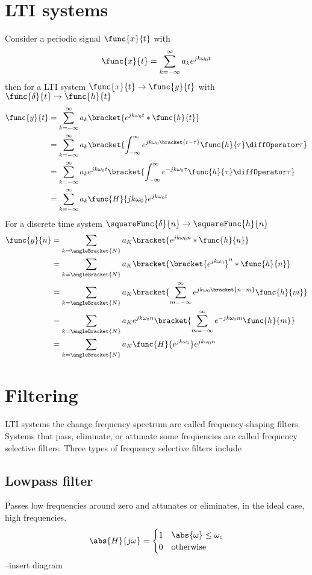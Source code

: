 \section{LTI systems}
Consider a periodic signal \(\func{x}{t}\) with 
\begin{equation*}
    \func{x}{t} = \sum_{k = -\infty}^{\infty} a_k e^{jk \omega_0 t}
\end{equation*}
then for a LTI system \(\func{x}{t} \to \func{y}{t}\) with \(\func{\delta}{t} \to \func{h}{t}\)
\begin{align*}
    \func{y}{t} &= \sum_{k = -\infty}^{\infty} a_k \bracket{e^{jk\omega_0 t} \ast \func{h}{t}}\\
    &= \sum_{k = -\infty}^{\infty} a_k \bracket{\int_{-\infty}^{\infty} e^{jk\omega_0 \bracket{t - \tau}}  \func{h}{\tau} \diffOperator \tau}\\
    &=  \sum_{k = -\infty}^{\infty} a_k e^{jk\omega_0 t}\bracket{\int_{-\infty}^{\infty} e^{-jk\omega_0\tau}  \func{h}{\tau} \diffOperator \tau}\\
    &= \sum_{k = -\infty}^{\infty} a_k \func{H}{jk\omega_0}e^{jk\omega_0 t}
\end{align*}
For a discrete time system \(\squareFunc{\delta}{n} \to \squareFunc{h}{n}\)
\begin{align*}
    \func{y}{n} &= \sum_{k = \angleBracket{N} } a_K \bracket{e^{jk\omega_0 n} \ast \func{h}{n}}\\
    &=  \sum_{k = \angleBracket{N} } a_K \bracket{\bracket{e^{jk\omega_0}}^n \ast \func{h}{n}}\\
    &=  \sum_{k = \angleBracket{N} } a_K \bracket{\sum_{m = -\infty}^{\infty} e^{jk\omega_0 \bracket{n-m}}\func{h}{m}}\\
    &=  \sum_{k = \angleBracket{N} } a_K e^{jk \omega_0 n}\bracket{\sum_{m = -\infty}^{\infty} e^{-jk\omega_0 m}\func{h}{m}}\\
    &=  \sum_{k = \angleBracket{N} } a_K \func{H}{e^{jk \omega_0}} e^{jk \omega_0 n}
\end{align*}

\section{Filtering}
LTI systems the change frequency spectrum are called frequency-shaping filters. Systems that pass, eliminate, or attunate some frequencies are called frequency selective filters. Three types of frequency selective filters include 
\subsection{Lowpass filter}
Passes low frequencies around zero and attunates or eliminates, in the ideal case, high frequencies.
\begin{equation*}
    \abs{H}{j\omega} = \begin{cases}
        1 & \abs{\omega} \leq \omega_c\\
        0 & \text{otherwise}
    \end{cases}
\end{equation*}
--insert diagram 

